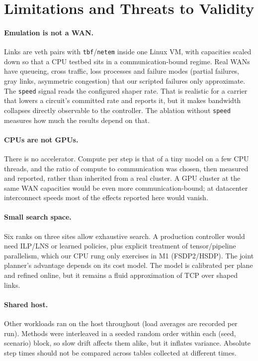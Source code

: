\section{Limitations and Threats to Validity}
\label{sec:limits}

\paragraph{Emulation is not a WAN.}
Links are veth pairs with \texttt{tbf}/\texttt{netem} inside one Linux VM, with capacities scaled down
so that a CPU testbed sits in a communication-bound regime. Real WANs have queueing, cross traffic,
loss processes and failure modes (partial failures, gray links, asymmetric congestion) that our scripted
failures only approximate. The \texttt{speed} signal reads the configured shaper rate. That is realistic
for a carrier that lowers a circuit's committed rate and reports it, but it makes bandwidth collapses
directly observable to the controller. The ablation without \texttt{speed} measures how much the results
depend on that.

\paragraph{CPUs are not GPUs.}
There is no accelerator. Compute per step is that of a tiny model on a few CPU threads, and
the ratio of compute to communication was chosen, then measured and reported, rather than inherited from a
real cluster. A GPU cluster at the same WAN capacities would be even more communication-bound; at datacenter
interconnect speeds most of the effects reported here would vanish.

\paragraph{Small search space.}
Six ranks on three sites allow exhaustive search. A production controller would need ILP/LNS or learned
policies, plus explicit treatment of tensor/pipeline parallelism, which our CPU rung only exercises in
M1 (FSDP2/HSDP). The joint planner's advantage depends on its cost model. The model is calibrated per
plane and refined online, but it remains a fluid approximation of TCP over shaped links.

\paragraph{Shared host.}
Other workloads ran on the host throughout (load averages are recorded per run). Methods were interleaved
in a seeded random order within each (seed, scenario) block, so slow drift affects them alike, but it
inflates variance. Absolute step times should not be compared across tables collected at different times.

